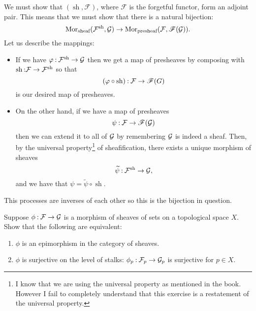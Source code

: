 \documentclass[12pt]{memoir}
\DeclareMathOperator{\sh}{sh}
\begin{document}
\begin{ptcbr}
    We must show that $(\sh,\mathscr{F})$, where $\mathscr{F}$ is the forgetful functor, form an adjoint pair. This means that we must show that there is a natural bijection:
    $$\Mor_{\text{sheaf}}(\cF^{\sh},\cG)\to\Mor_{\text{presheaf}}(\cF,\mathscr{F}(\cG)).$$
    Let us describe the mappings:
    \begin{itemize}
        \itemsep=-0.4em
        \item If we have $\vf\:\cF^{\sh}\to\cG$ then we get a map of presheaves by composing with $\sh\:\cF\to\cF^{\sh}$ so that 
        $$(\vf\circ\sh)\:\cF\to\mathscr{F}(G)$$
        is our desired map of presheaves.
        \item On the other hand, if we have a map of presheaves
        $$\psi\mathbin{:}\mathcal{F}\to\mathscr{F}(\mathcal{G})$$
        then we can extend it to all of $\mathcal{G}$ by remembering $\mathcal{G}$ is indeed a sheaf. Then, by the universal property\footnote{I know that we are using the universal property as mentioned in the book. However I fail to completely understand that this exercise is a restatement of the universal property.} of sheafification, there exists a unique morphism of sheaves 
        $$\widetilde{\psi}\:\cF^{\sh}\to\cG,$$
        and we have that $\psi=\widetilde{\psi}\circ\sh$.
    \end{itemize}
    This processes are inverses of each other so this is the bijection in question. 
\end{ptcbr}

\begin{Ej}
    Suppose $\phi\mathbin{:}\mathcal{F}\to\mathcal{G}$ is a morphism of sheaves of sets on a topological space $X$. Show that the following are equivalent:
\begin{enumerate}
    \item $\phi$ is an epimorphism in the category of sheaves. 
    \item $\phi$ is surjective on the level of stalks: $\phi_p\mathbin{:}\mathcal{F}_p\to\mathcal{G}_p$ is surjective for $p\in X$.
\end{enumerate}
\end{Ej}
\end{document}
